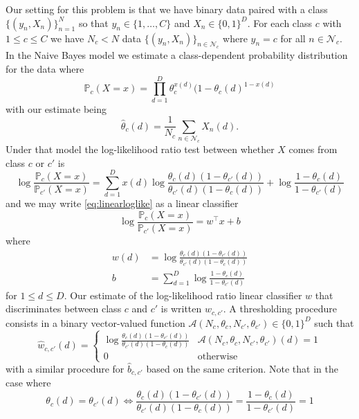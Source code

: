 \documentclass{article}
\begin{document}
Our setting for this problem is that we have binary data paired
with a class
$\{(y_n,X_n)\}_{n=1}^N$ so that $y_n\in \{1,\ldots,C\}$ and
$X_n\in \{0,1\}^D$.  For each class $c$ with $1\leq c\leq C$
we have $N_c<  N$ data $\{(y_n,X_n)\}_{n\in\mathcal{N}_c}$
where $y_n=c$ for all $n\in\mathcal{N}_c$.  In the Naive Bayes
model we estimate a class-dependent probability distribution
for the data where
\begin{equation}
\mathbb{P}_c(X = x) = \prod_{d=1}^D \theta_c^{x(d)}(1-\theta_c(d)^{1-x(d)}
\end{equation}
with our estimate being 
\begin{equation}
\hat{\theta}_c(d) = \frac{1}{N_c}\sum_{n\in\mathcal{N}_c} X_n(d).
\end{equation}
Under that model the log-likelihood ratio test between whether
$X$ comes from class $c$ or $c'$ is
\begin{equation}\label{eq:linearloglike}
\log\frac{\mathbb{P}_c(X=x)}{\mathbb{P}_{c'}(X=x)} =
\sum_{d=1}^D x(d)\log\frac{\theta_c(d)(1-\theta_{c'}(d))}{\theta_{c'}(d)(1-\theta_c(d))} + \log\frac{1-\theta_c(d)}{1-\theta_{c'}(d)}
\end{equation}
and we may write \autoref{eq:linearloglike} as a linear classifier
\begin{equation}
\log\frac{\mathbb{P}_c(X=x)}{\mathbb{P}_{c'}(X=x)} = w^\top x+b
\end{equation}
where
\begin{align*}
w(d) &= \log\frac{\theta_c(d)(1-\theta_{c'}(d))}{\theta_{c'}(d)(1-\theta_c(d))}\\
b &= \sum_{d=1}^D \log\frac{1-\theta_c(d)}{1-\theta_{c'}(d)}
\end{align*}
for $1\leq d\leq D$.  Our estimate of the log-likelihood ratio
linear classifier $w$ that discriminates between class $c$ and
$c'$ is written $\hat{w}_{c,c'}$.  A thresholding procedure
consists in a binary vector-valued function $\mathcal{A}(N_c,\theta_c,N_{c'},\theta_{c'})\in \{0,1\}^D$ such that
\begin{equation}
\hat{w}_{c,c'}(d) = \begin{cases}
\log\frac{\theta_c(d)(1-\theta_{c'}(d))}{\theta_{c'}(d)(1-\theta_c(d))} & \mathcal{A}(N_c,\theta_c,N_{c'},\theta_{c'})(d) =1\\
0 & \text{otherwise}
\end{cases}
\end{equation}
with a similar procedure for $\hat{b}_{c,c'}$ based on the 
same criterion.
Note that in the case where
\begin{equation}
\theta_c(d)=\theta_{c'}(d) \Leftrightarrow \frac{\theta_c(d)(1-\theta_{c'}(d))}{\theta_{c'}(d)(1-\theta_c(d))} = \frac{1-\theta_c(d)}{1-\theta_{c'}(d)} = 1 
\end{equation}
\end{document}
